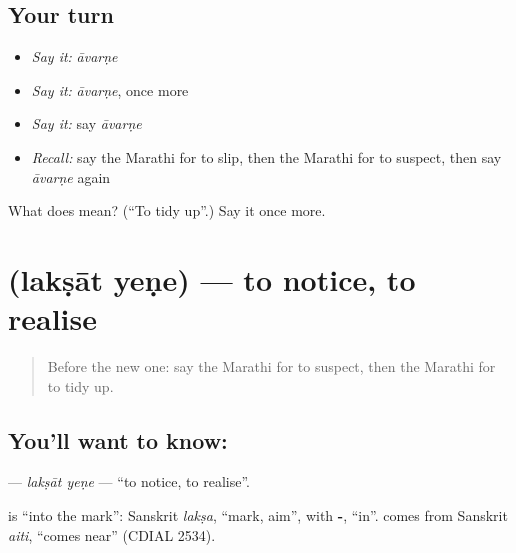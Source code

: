 \subsection*{Your turn}
\begin{itemize}
\raggedright
  \item \emph{Say it:} \emph{āvarṇe}
  \item \emph{Say it:} \emph{āvarṇe}, once more
  \item \emph{Say it:} say \emph{āvarṇe}
  \item \emph{Recall:} say the Marathi for to slip, then the Marathi for to suspect, then say \emph{āvarṇe} again
\end{itemize}

\begin{tcolorbox}[breakable,colback=teal!4,colframe=teal!35!black,title={Before you move on}]
What does  mean? (\textquotedblleft{}To tidy up\textquotedblright{}.) Say it once more.
\end{tcolorbox}
\section[\texorpdfstring{\mr{लक्षात} \mr{येणे} (lakṣāt yeṇe)}{लक्षात येणे (lakṣāt yeṇe)}]{  (lakṣāt yeṇe) — to notice, to realise}

\label{lesson:MR-C168-laksat-yene}



\begin{quote}
Before the new one: say the Marathi for to suspect, then the Marathi for to tidy up.
\end{quote}

\subsection*{You'll want to know:  }
\textbf{ } — \emph{lakṣāt yeṇe} — \textquotedblleft{}to notice, to realise\textquotedblright{}.

\begin{cousinweb}
\textbf{} is \textquotedblleft{}into the mark\textquotedblright{}: Sanskrit \emph{lakṣa}, \textquotedblleft{}mark, aim\textquotedblright{}, with \textbf{-}, \textquotedblleft{}in\textquotedblright{}. \textbf{} comes from Sanskrit \emph{aiti}, \textquotedblleft{}comes near\textquotedblright{} (CDIAL 2534).
\end{cousinweb}

